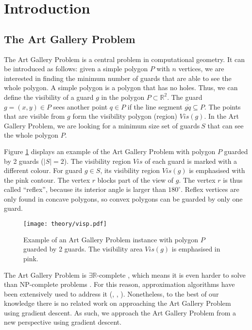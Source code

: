 \section{Introduction}
\subsection{The Art Gallery Problem}

The Art Gallery Problem \cite{o1987art} is a central problem in computational geometry. It can be introduced as follows: given a simple polygon $P$ with $n$ vertices, we are interested in finding the minimum number of guards that are able to see the whole polygon. A simple polygon is a polygon that has no holes. Thus, we can define the visibility of a guard $g$ in the polygon $P \subset \mathbb R^2$. The guard $g = (x, y) \in P$ sees another point $q \in P$ if the line segment $\overline{gq} \subseteq P$. The points that are visible from $g$ form the visibility polygon (region) $\mathit{Vis}(g)$. In the Art Gallery Problem, we are looking for a minimum size set of guards$~S$ that can see the whole polygon $P$.

Figure \ref{fig:art} displays an example of the Art Gallery Problem with polygon $P$ guarded by 2 guards ($|S| = 2$). The visibility region $\mathit{Vis}$ of each guard is marked with a different colour. For guard $g \in S$, its visibility region $\mathit{Vis}(g)$ is emphasised with the pink contour. The vertex $r$ blocks part of the view of $g$. The vertex $r$ is thus called ``reflex'', because its interior angle is larger than $180^\circ$. Reflex vertices are only found in concave polygons, so convex polygons can be guarded by only one guard.

\begin{figure}[h!]
    \centering
    \texttt{[image: theory/visp.pdf]}
    \caption{Example of an Art Gallery Problem instance with polygon $P$ guarded by 2 guards. The visibility area $\mathit{Vis}(g)$ is emphasised in pink.}
    \label{fig:art}
\end{figure}

The Art Gallery Problem is $\exists \mathbb R$-complete \cite{abrahamsen2021art}, which means it is even harder to solve than NP-complete problems \cite{schaefer2009complexity}. For this reason, approximation algorithms have been extensively used to address it (\cite{DBLP:journals/corr/BonnetM16b}, \cite{GHOSH2010718}, \cite{DBLP:journals/corr/abs-2007-06920}). Nonetheless, to the best of our knowledge there is no related work on approaching the Art Gallery Problem using gradient descent. As such, we approach the Art Gallery Problem from a new perspective using gradient descent.

